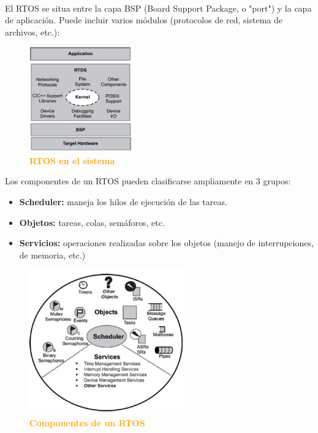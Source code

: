 \documentclass{article}
\begin{document}
\\

El RTOS se situa entre la capa BSP (Board Support Package, o "port") y la capa de aplicación. Puede incluir varios módulos
(protocolos de red, sistema de archivos, etc.):\\

\begin{figure}[H]
   \centering
   \includegraphics[width=0.4\textwidth]{figures/rtos.jpg}
   \centering
   \caption{\textbf{\textcolor{Orange}{RTOS en el sistema}}}
\end{figure}
\clearpage

Los componentes de un RTOS pueden clasificarse ampliamente en 3 grupos:
\begin{itemize}[label=$\star$]
\item \textbf{Scheduler:} maneja los hilos de ejecución de las tareas.
\item \textbf{Objetos:} tareas, colas, semáforos, etc.
\item \textbf{Servicios:} operaciones realizadas sobre los objetos (manejo de interrupciones, de memoria, etc.)
\end{itemize}

\begin{figure}[H]
   \centering
   \includegraphics[width=0.6\textwidth]{figures/rtos2.jpg}
   \centering
   \caption{\textbf{\textcolor{Orange}{Componentes de un RTOS}}}
\end{figure}
\end{document}
